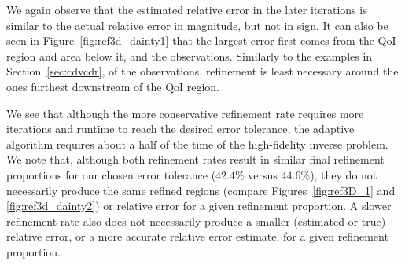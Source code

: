 %
We again observe that the estimated relative error in the later iterations is similar to the actual relative error in magnitude, but not in sign. It can also be seen in Figure~\ref{fig:ref3d_dainty1} that the largest error first comes from the QoI region and area below it, and the observations. Similarly to the examples in Section~\ref{sec:cdvcdr}, of the observations, refinement is least necessary around the ones furthest downstream of the QoI region.

We see that although the more conservative refinement rate requires more iterations and runtime to reach the desired error tolerance, the adaptive algorithm requires about a half of the time of the high-fidelity inverse problem. We note that, although both refinement rates result in similar final refinement proportions for our chosen error tolerance ($42.4\%$ versus $44.6\%$), they do not necessarily produce the same refined regions (compare Figures~\ref{fig:ref3D_1} and \ref{fig:ref3d_dainty2}) or relative error for a given refinement proportion. A slower refinement rate also does not necessarily produce a smaller (estimated or true) relative error, or a more accurate relative error estimate, for a given refinement proportion.

